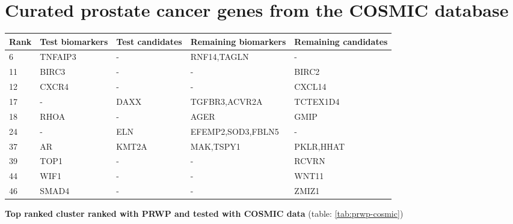 \section{Curated prostate cancer genes from the COSMIC database}
\begin{sidewaystable}
    \begin{tabular}{|l|l|l|l|l|}
        \hline
        \textbf{Rank}
        & \textbf{Test biomarkers}
        & \textbf{Test candidates}
        & \textbf{Remaining biomarkers}
        & \textbf{Remaining candidates} \\
        \hline
        6	& TNFAIP3	& -	& RNF14,TAGLN	& - \\
        \hline
        11	& BIRC3	& -	& -	& BIRC2 \\
        \hline
        12	& CXCR4	& -	& -	& CXCL14 \\
        \hline
        17	& -	& DAXX	& TGFBR3,ACVR2A	& TCTEX1D4 \\
        \hline
        18	& RHOA	& -	& AGER	& GMIP \\
        \hline
        24	& -	& ELN	& EFEMP2,SOD3,FBLN5	& - \\
        \hline
        37	& AR	& KMT2A	& MAK,TSPY1	& PKLR,HHAT \\
        \hline
        39	& TOP1	& -	& -	& RCVRN \\
        \hline
        44	& WIF1	& -	& -	& WNT11 \\
        \hline
        46	& SMAD4	& -	& -	& ZMIZ1 \\
        \hline
    \end{tabular}
    \caption{iRefWeb network ranked with PRWP and COSMIC data - matched 423 test
    genes from the COSMIC data set out of 580 possible}
    \label{tab:prwp-cosmic}
\end{sidewaystable}

\textbf{Top ranked cluster ranked with PRWP and tested with COSMIC data}
(table: \ref{tab:prwp-cosmic})

